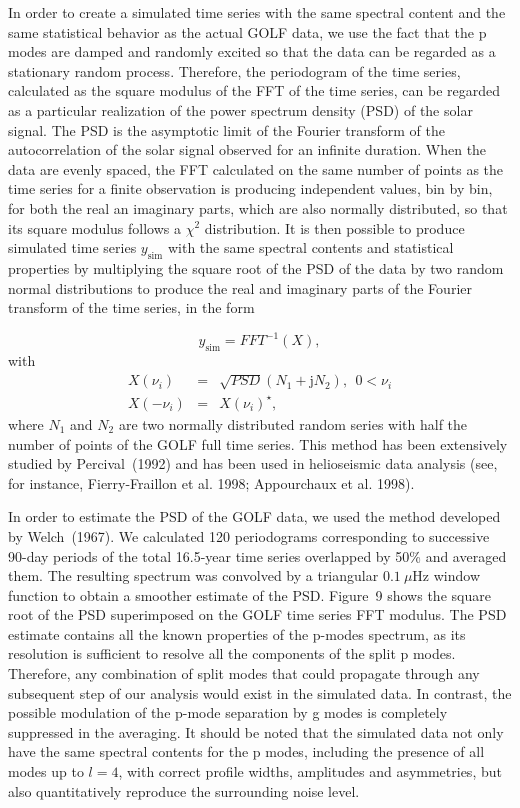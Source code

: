 \documentclass[bibyear]{aa}
\begin{document}
In order to create a simulated time series with the same spectral content and the same statistical behavior as the actual GOLF data, we use the fact that the p modes are damped and randomly excited so that the data can be regarded as a stationary random process. 
Therefore, the periodogram of the time series, calculated as the square modulus of the FFT of the time series, can be regarded as a particular realization of the power spectrum density (PSD) of the solar signal. The PSD is the asymptotic limit of the Fourier transform of the autocorrelation of the solar signal observed for an infinite duration. When the data are evenly spaced, the FFT calculated on the same number of points as the time series for a finite observation is producing independent values, bin by bin, for both the real an imaginary parts, which  are
also normally distributed, so that its square modulus follows a $\chi^2$ distribution. It is then possible to produce simulated time series $y_\mathrm{sim}$ with the same spectral contents and statistical properties by multiplying the square root of the PSD of the data by two random normal distributions to produce the real and imaginary parts of the Fourier transform of the time series, in the form

\begin{equation}\label{eq:simu}
y_\mathrm{sim} = FFT^{-1}(X)
,\end{equation}
with
\begin{eqnarray}
X(\nu_i)&=&\sqrt{PSD}(N_1+\mathrm{j}N_2),\ \  0<\nu_i\\
X(-\nu_i)&=&X(\nu_i)^{\star}
,\end{eqnarray}
where $N_1$ and $N_2$ are two normally distributed random series with half the number of points of the GOLF full time series. This method has been extensively studied by Percival~(1992) and has been used in helioseismic data analysis (see, for instance, Fierry-Fraillon et al. 1998; Appourchaux et al. 1998).

In order to estimate the PSD of the GOLF data, we used the method developed by Welch~(1967). We calculated 120 periodograms corresponding to successive 90-day periods of the total 16.5-year time series overlapped by 50\% and averaged them. The resulting spectrum was convolved by a triangular $0.1\ \mu$Hz window function to obtain a smoother estimate of the PSD. Figure~9 shows the square root of the PSD superimposed on the GOLF time series FFT modulus. The PSD estimate contains all the known properties of the p-modes spectrum, as its resolution is sufficient to resolve all the components of the split p modes. Therefore, any combination of split modes that could propagate through any subsequent step of our analysis would exist in the simulated data. In contrast, the possible modulation of the p-mode separation by g modes is completely suppressed in the averaging. It should be noted that the simulated data not only have the same  spectral contents for the p modes, including the presence of all modes up to $l=4$, with correct profile widths, amplitudes and asymmetries, but also quantitatively reproduce the surrounding noise level. 
\end{document}
